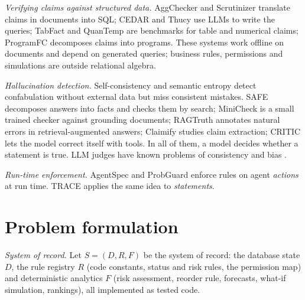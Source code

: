 \documentclass[journal]{IEEEtran}
\renewcommand{\paragraph}[1]{\par\textit{#1}\enspace}
\begin{document}
\paragraph{Verifying claims against structured data.} AggChecker \cite{jo2019aggchecker} and Scrutinizer
\cite{karagiannis2020scrutinizer} translate claims in documents into SQL; CEDAR
\cite{jayasekara2025cedar} and Thucy \cite{theologitis2025thucy} use LLMs to write the queries; TabFact
\cite{chen2020tabfact} and QuanTemp \cite{venktesh2024quantemp} are benchmarks for table and numerical
claims; ProgramFC \cite{pan2023programfc} decomposes claims into programs. These systems work offline on
documents and depend on generated queries; business rules, permissions and simulations are outside
relational algebra.

\paragraph{Hallucination detection.} Self-consistency \cite{manakul2023selfcheckgpt} and semantic entropy
\cite{farquhar2024semantic} detect confabulation without external data but miss consistent mistakes. SAFE
\cite{wei2024longform} decomposes answers into facts and checks them by search; MiniCheck
\cite{tang2024minicheck} is a small trained checker against grounding documents; RAGTruth
\cite{niu2024ragtruth} annotates natural errors in retrieval-augmented answers; Claimify
\cite{metropolitansky2025claimify} studies claim extraction; CRITIC \cite{gou2024critic} lets the model
correct itself with tools. In all of them, a model decides whether a statement is true. LLM judges have
known problems of consistency and bias \cite{gu2024judge}.

\paragraph{Run-time enforcement.} AgentSpec \cite{wang2026agentspec} and ProbGuard \cite{wang2026probguard}
enforce rules on agent \emph{actions} at run time. TRACE applies the same idea to \emph{statements}.

\section{Problem formulation}
\label{sec:problem}

\paragraph{System of record.} Let $S=(D,R,F)$ be the system of record: the database state $D$, the rule
registry $R$ (code constants, status and risk rules, the permission map) and deterministic analytics $F$
(risk assessment, reorder rule, forecasts, what-if simulation, rankings), all implemented as tested code.
\end{document}
